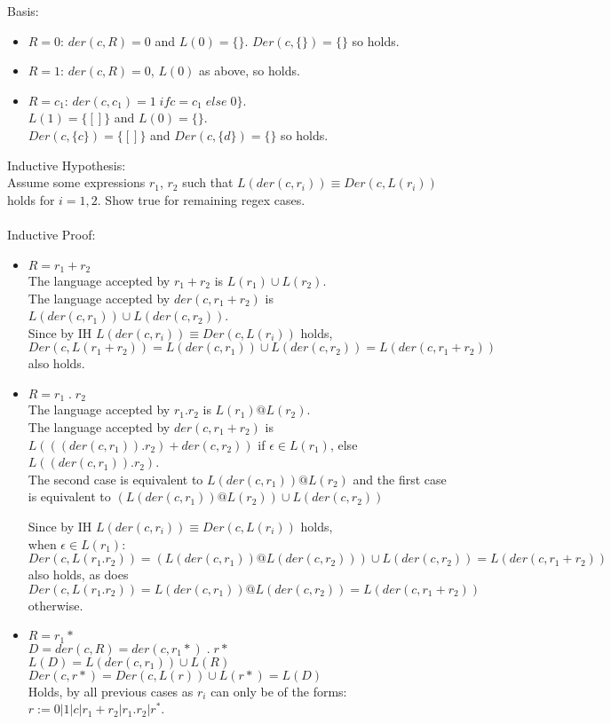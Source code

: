 \documentclass[english]{scrartcl}
\begin{document}
Basis:
\begin{itemize}
    \item $R=0$: $der(c, R) = 0$ and $L(0) = \{\}$. $Der(c, \{\})=\{\}$ so holds.
    \item $R=1$: $der(c, R) = 0$, $L(0)$ as above, so holds.
    \item $R=c_1$: $der(c, c_1) = 1 \; if c=c_1 \; else \; 0\}$.\\
    $L(1) = \{[]\}$ and $L(0) = \{\}$. \\
    $Der(c, \{c\})=\{[]\}$ and $Der(c, \{d\})=\{\}$ so holds.
\end{itemize}

Inductive Hypothesis: \\

Assume some expressions $r_1$, $r_2$ such that $L(der(c, r_i)) \equiv Der(c, L(r_i))$ holds for $i = 1, 2$.
Show true for remaining regex cases. \\
\\
Inductive Proof:
\begin{itemize}
    \item $R=r_1+r_2$ \\
    The language accepted by $r_1+r_2$ is $L(r_1) \cup L(r_2)$.\\
    The language accepted by $der(c, r_1+r_2)$ is $L(der(c,r_1)) \cup L(der(c,r_2))$.\\
    Since by IH $L(der(c, r_i)) \equiv Der(c, L(r_i))$ holds, \\
    $Der(c, L(r_1+r_2)) = L(der(c,r_1)) \cup L(der(c,r_2)) = L(der(c, r_1+r_2))$ also holds.

    \item $R=r_1\;.\;r_2$ \\
    The language accepted by $r_1.r_2$ is $L(r_1) @ L(r_2)$.\\
    The language accepted by $der(c, r_1+r_2)$ is \\
    $L(((der(c, r_1)).r_2) + der(c, r_2))$ if $\epsilon \in L(r_1)$,
    else $L((der(c, r_1)).r_2)$.\\

    The second case is equivalent to $L(der(c,r_1)) @ L(r_2)$
    and the first case is equivalent to $(L(der(c,r_1)) @ L(r_2)) \cup L(der(c,r_2))$

    Since by IH $L(der(c, r_i)) \equiv Der(c, L(r_i))$ holds, \\
    when $\epsilon \in L(r_1)$: \\
    $Der(c, L(r_1.r_2)) = (L(der(c,r_1)) @ L(der(c,r_2))) \cup L(der(c,r_2)) = L(der(c, r_1+r_2))$ also holds,
    as does $Der(c, L(r_1.r_2)) = L(der(c,r_1)) @ L(der(c,r_2)) = L(der(c, r_1+r_2))$ otherwise.


    \item $R=r_1*$\\
    $D = der(c, R) = der(c, r_1*)\;.\;r*$\\
    $L(D) = L(der(c, r_1)) \cup L(R)$ \\
    $Der(c, r*) = Der(c, L(r)) \cup L(r*) = L(D)$\\
    Holds, by all previous cases as $r_i$ can only be of the forms:\\
     $r:=0|1|c|r_1+r_2|r_1.r_2|r^*$.

\end{itemize}
\end{document}

